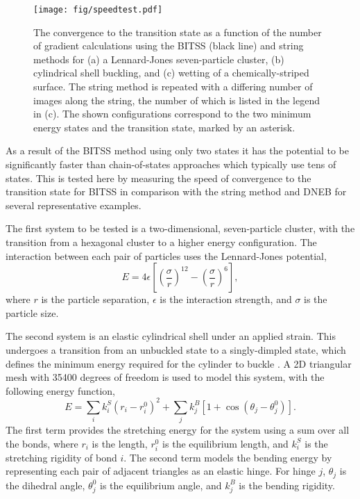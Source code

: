 \documentclass[aps,prl,twocolumn,10pt,groupedaddress]{revtex4-2}
\begin{document}
\begin{figure*}[tb]
  \texttt{[image: fig/speedtest.pdf]}
  \caption{\label{fig:speedtest}
    The convergence to the transition state as a function of the number of gradient calculations using the BITSS (black line) and string methods for (a) a Lennard-Jones seven-particle cluster, (b) cylindrical shell buckling, and (c) wetting of a chemically-striped surface.
    The string method is repeated with a differing number of images along the string, the number of which is listed in the legend in (c).
    The shown configurations correspond to the two minimum energy states and the transition state, marked by an asterisk.
  }
\end{figure*}
As a result of the BITSS method using only two states it has the potential to be significantly faster than chain-of-states approaches which typically use tens of states.
This is tested here by measuring the speed of convergence to the transition state for BITSS in comparison with the string method and DNEB for several representative examples.

The first system to be tested is a two-dimensional, seven-particle cluster, with the transition from a hexagonal cluster to a higher energy configuration.
The interaction between each pair of particles uses the Lennard-Jones potential,
\begin{equation}
  E = 4\epsilon \left[ \left(\frac{\sigma}{r}\right)^{12} - \left(\frac{\sigma}{r}\right)^6 \right],
\end{equation}
where $r$ is the particle separation, $\epsilon$ is the interaction strength, and $\sigma$ is the particle size.

The second system is an elastic cylindrical shell under an applied strain.
This undergoes a transition from an unbuckled state to a singly-dimpled state, which defines the minimum energy required for the cylinder to buckle \cite{Panter2019}.
A 2D triangular mesh with 35400 degrees of freedom is used to model this system, with the following energy function,
\begin{equation}
  E = \sum_i k^S_i (r_i - r^0_i)^2 + \sum_j k^B_j [1 + \cos(\theta_j - \theta^0_j)].
\end{equation}
The first term provides the stretching energy for the system using a sum over all the bonds, where $r_i$ is the length, $r^0_i$ is the equilibrium length, and $k^S_i$ is the stretching rigidity of bond $i$.
The second term models the bending energy by representing each pair of adjacent triangles as an elastic hinge.
For hinge $j$, $\theta_j$ is the dihedral angle, $\theta^0_j$ is the equilibrium angle, and $k^B_j$ is the bending rigidity.
\end{document}
